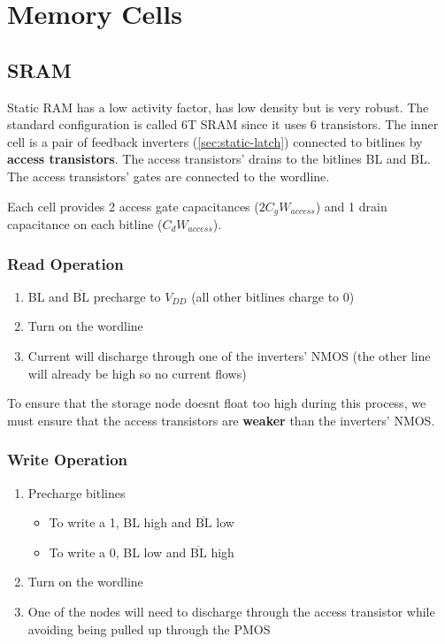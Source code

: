 \documentclass[11pt]{report}
\begin{document}
\section{Memory Cells}
\subsection{SRAM}
Static RAM has a low activity factor, has low density but is very robust. The standard configuration is called 6T SRAM since it uses 6 transistors. The inner cell is a pair of feedback inverters (\autoref{sec:static-latch}) connected to bitlines by \textbf{access transistors}. The access transistors' drains to the bitlines BL and $\overline{\text{BL}}$. The access transistors' gates are connected to the wordline.

Each cell provides 2 access gate capacitances ($2C_g W_{access}$) and 1 drain capacitance on each bitline ($C_dW_{access}$).

\subsubsection{Read Operation}
\begin{enumerate}
	\item BL and $\overline{\text{BL}}$ precharge to $V_{DD}$ (all other bitlines charge to 0)
	\item Turn on the wordline
	\item Current will discharge through one of the inverters' NMOS (the other line will already be high so no current flows)
\end{enumerate}

To ensure that the storage node doesnt float too high during this process, we must ensure that the access transistors are \textbf{weaker} than the inverters' NMOS.

\subsubsection{Write Operation}
\begin{enumerate}
	\item Precharge bitlines
	\begin{itemize}
		\item To write a 1, BL high and $\overline{\text{BL}}$ low
		\item To write a 0, BL low and $\overline{\text{BL}}$ high
	\end{itemize}
	\item Turn on the wordline
	\item One of the nodes will need to discharge through the access transistor while avoiding being pulled up through the PMOS
\end{enumerate}
\end{document}

